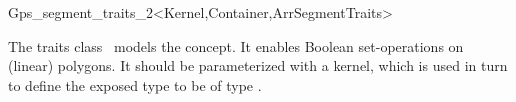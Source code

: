\ccRefPageBegin

\begin{ccRefClass}{Gps_segment_traits_2<Kernel,Container,ArrSegmentTraits>}

\ccThreeToTwo

\ccDefinition
The traits class \ccRefName\ models the 
concept. It enables Boolean set-operations on (linear) polygons.
It should be parameterized with a kernel, which is used in turn to
define the exposed type  to be of type
.

 
\ccIsModel

\end{ccRefClass}
\ccRefPageEnd
